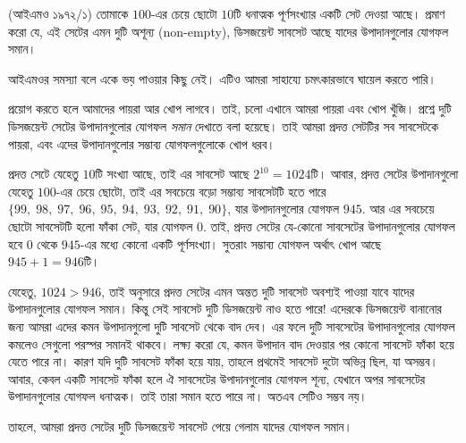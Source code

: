\begin{example}(আইএমও ১৯৭২/১)
	তোমাকে $100$-এর চেয়ে ছোটো $10$টি  ধনাত্মক পূর্ণসংখ্যার একটি সেট দেওয়া আছে। প্রমাণ করো যে, এই সেটের এমন দুটি অশূন্য (non-empty), ডিসজয়েন্ট সাবসেট আছে যাদের উপাদানগুলোর যোগফল সমান।
\end{example}
\begin{solution}
	আইএমওর সমস্যা বলে একে ভয় পাওয়ার কিছু নেই। এটিও আমরা \phpnamer{} সাহায্যে চমৎকারভাবে ঘায়েল করতে পারি।

	\phpname{} প্রয়োগ করতে হলে আমাদের পায়রা আর খোপ লাগবে। তাই, চলো এখানে আমরা পায়রা এবং খোপ খুঁজি। প্রশ্নে দুটি ডিসজয়েন্ট সেটের উপাদানগুলোর যোগফল \textit{সমান} দেখাতে বলা হয়েছে। তাই আমরা প্রদত্ত সেটটির সব সাবসেটকে পায়রা, এবং এদের উপাদানগুলোর সম্ভাব্য যোগফলগুলোকে খোপ ধরব।

	প্রদত্ত সেটে যেহেতু $10$টি সংখ্যা আছে, তাই এর সাবসেট আছে $2^{10}=1024$টি। আবার, প্রদত্ত সেটের উপাদানগুলো যেহেতু $100$-এর চেয়ে ছোটো, তাই এর সবচেয়ে বড়ো সম্ভাব্য সাবসেটটি হতে পারে $\{99,\; 98,\; 97,\; 96,\; 95,\; 94,\; 93,\; 92,\; 91,\; 90\}$, যার উপাদানগুলোর যোগফল $945$. আর এর সবচেয়ে ছোটো সাবসেটটি হলো ফাঁকা সেট, যার যোগফল $0$. তাই, প্রদত্ত সেটের যে-কোনো সাবসেটের উপাদানগুলোর যোগফল হবে $0$ থেকে $945$-এর মধ্যে কোনো একটি পূর্ণসংখ্যা। সুতরাং সম্ভাব্য যোগফল অর্থাৎ খোপ আছে $945+1=946$টি।

	যেহেতু, $1024>946$, তাই \phpname{} অনুসারে প্রদত্ত সেটের এমন অন্তত দুটি সাবসেট অবশ্যই পাওয়া যাবে যাদের উপাদানগুলোর যোগফল সমান। কিন্তু সেই সাবসেট দুটি ডিসজয়েন্ট নাও হতে পারে! এদেরকে ডিসজয়েন্ট বানানোর জন্য আমরা এদের কমন উপাদানগুলো দুটি সাবসেট থেকে বাদ দেব। এর ফলে দুটি সাবসেটের উপাদানগুলোর যোগফল কমলেও সেগুলো পরস্পর সমানই থাকবে। লক্ষ্য করো যে, কমন উপাদান বাদ দেওয়ার পর কোনো সাবসেট ফাঁকা হয়ে যেতে পারে না। কারণ যদি দুটি সাবসেট ফাঁকা হয়ে যায়, তাহলে প্রথমেই সাবসেট দুটো অভিন্ন ছিল, যা অসম্ভব। আবার, কেবল একটি সাবসেট ফাঁকা হলে ঐ সাবসেটের উপাদানগুলোর যোগফল শূন্য, যেখানে অপর সাবসেটের উপাদানগুলোর যোগফল ধনাত্মক। তাই তারা সমান হতে পারে না। অতএব সেটিও সম্ভব নয়।

	তাহলে, আমরা প্রদত্ত সেটের দুটি ডিসজয়েন্ট সাবসেট পেয়ে গেলাম যাদের যোগফল সমান।
\end{solution}

